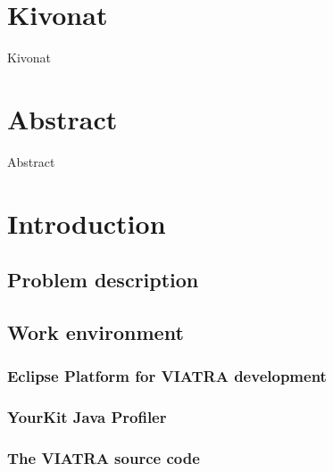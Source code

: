 \documentclass[11pt,a4paper,oneside]{report}
\begin{document}
\selectthesislanguage

\tableofcontents\cleardoublepage



\setcounter{page}{1}

\selecthungarian
\chapter*{Kivonat}
Kivonat

\vfill

\selectenglish
\chapter*{Abstract}
Abstract

\vfill


\cleardoublepage
\selectthesislanguage
{}
\setcounter{romanPage}{\value{page}}



\chapter{Introduction}
\section{Problem description}
\section{Work environment}
\subsection{Eclipse Platform for VIATRA development}
\subsection{YourKit Java Profiler}
\subsection{The VIATRA source code}
\end{document}
